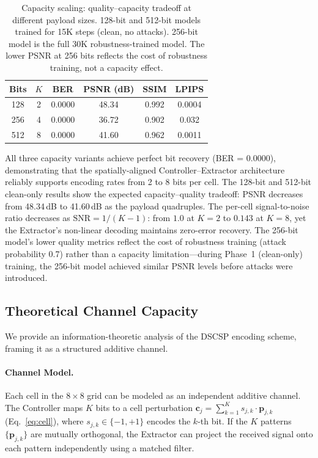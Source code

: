 \documentclass[10pt, twocolumn]{article}
\begin{document}
\begin{table}[t]
\centering
\caption{Capacity scaling: quality--capacity tradeoff at different payload sizes. 128-bit and 512-bit models trained for 15K steps (clean, no attacks). 256-bit model is the full 30K robustness-trained model. The lower PSNR at 256 bits reflects the cost of robustness training, not a capacity effect.}
\label{tab:scaling}
\small
\begin{tabular}{@{}cccccc@{}}
\toprule
\textbf{Bits} & \textbf{$K$} & \textbf{BER} & \textbf{PSNR (dB)} & \textbf{SSIM} & \textbf{LPIPS} \\
\midrule
128  & 2 & 0.0000 & 48.34 & 0.992 & 0.0004 \\
256  & 4 & 0.0000 & 36.72 & 0.902 & 0.032 \\
512  & 8 & 0.0000 & 41.60 & 0.962 & 0.0011 \\
\bottomrule
\end{tabular}
\end{table}

All three capacity variants achieve perfect bit recovery (BER = 0.0000), demonstrating that the spatially-aligned Controller--Extractor architecture reliably supports encoding rates from 2 to 8 bits per cell.
The 128-bit and 512-bit clean-only results show the expected capacity--quality tradeoff: PSNR decreases from 48.34\,dB to 41.60\,dB as the payload quadruples.
The per-cell signal-to-noise ratio decreases as $\text{SNR} = 1/(K-1)$: from $1.0$ at $K=2$ to $0.143$ at $K=8$, yet the Extractor's non-linear decoding maintains zero-error recovery.
The 256-bit model's lower quality metrics reflect the cost of robustness training (attack probability 0.7) rather than a capacity limitation---during Phase~1 (clean-only) training, the 256-bit model achieved similar PSNR levels before attacks were introduced.


\subsection{Theoretical Channel Capacity}
\label{sec:capacity}

We provide an information-theoretic analysis of the DSCSP encoding scheme, framing it as a structured additive channel.

\paragraph{Channel Model.}
Each cell in the $8 \times 8$ grid can be modeled as an independent additive channel.
The Controller maps $K$ bits to a cell perturbation $\mathbf{c}_j = \sum_{k=1}^{K} s_{j,k} \cdot \mathbf{p}_{j,k}$ (Eq.~\ref{eq:cell}), where $s_{j,k} \in \{-1, +1\}$ encodes the $k$-th bit.
If the $K$ patterns $\{\mathbf{p}_{j,k}\}$ are mutually orthogonal, the Extractor can project the received signal onto each pattern independently using a matched filter.
\end{document}
